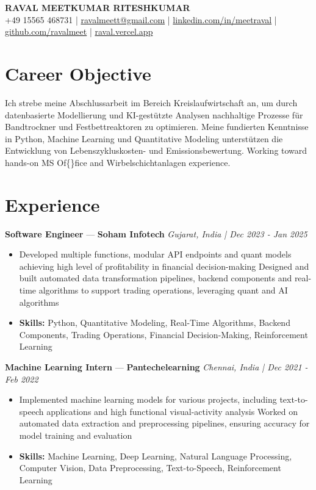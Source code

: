 \documentclass[a4paper,10pt]{article}
\begin{document}
\begin{center}
  {\Large\bfseries RAVAL MEETKUMAR RITESHKUMAR}\\[2pt]
  {\small +49 15565 468731 \;|\; \href{mailto:ravalmeett@gmail.com}{ravalmeett@gmail.com} \;|\; \href{https://www.linkedin.com/in/meetraval/}{linkedin.com/in/meetraval} \;|\; \href{https://github.com/ravalmeet}{github.com/ravalmeet} \;|\; \href{https://raval.vercel.app/}{raval.vercel.app}}
\end{center}
\vspace{-3pt}

\section*{Career Objective}
Ich strebe meine Abschlussarbeit im Bereich Kreislaufwirtschaft an, um durch datenbasierte Modellierung und KI-gestützte Analysen nachhaltige Prozesse für Bandtrockner und Festbettreaktoren zu optimieren. Meine fundierten Kenntnisse in Python, Machine Learning und Quantitative Modeling unterstützen die Entwicklung von Lebenszykluskosten- und Emissionsbewertung. Working toward hands-on MS Of\{\}fice and Wirbelschichtanlagen experience.\par

\section*{Experience}
\textbf{Software Engineer} — \textbf{Soham Infotech} \hfill \textit{Gujarat, India \;|\; Dec 2023 - Jan 2025}\par
\vspace{1pt}
\begin{itemize}
  \item Developed multiple functions, modular API endpoints and quant models achieving high level of profitability in financial decision-making Designed and built automated data transformation pipelines, backend components and real-time algorithms to support trading operations, leveraging quant and AI algorithms
  \item \textbf{Skills:} Python, Quantitative Modeling, Real-Time Algorithms, Backend Components, Trading Operations, Financial Decision-Making, Reinforcement Learning
\end{itemize}
\vspace{3pt}
\textbf{Machine Learning Intern} — \textbf{Pantechelearning} \hfill \textit{Chennai, India \;|\; Dec 2021 - Feb 2022}\par
\vspace{1pt}
\begin{itemize}
  \item Implemented machine learning models for various projects, including text-to-speech applications and high functional visual-activity analysis Worked on automated data extraction and preprocessing pipelines, ensuring accuracy for model training and evaluation
  \item \textbf{Skills:} Machine Learning, Deep Learning, Natural Language Processing, Computer Vision, Data Preprocessing, Text-to-Speech, Reinforcement Learning
\end{itemize}
\end{document}
